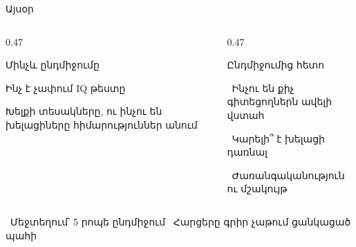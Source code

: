 \begin{frame}{Այսօր}
  \begin{columns}[T]
    \begin{column}{0.47\textwidth}
      \begin{card}[colback=peach!40!cream]
        {\blackfont Մինչև ընդմիջումը}\par\medskip
        \par\smallskip
        Ինչ է չափում IQ թեստը\par\medskip
        \par\smallskip
        Խելքի տեսակները, ու ինչու են խելացիները հիմարություններ անում
      \end{card}
    \end{column}
    \begin{column}{0.47\textwidth}
      \begin{card}[colback=lavender!45!cream]
        {\blackfont Ընդմիջումից հետո}\par\medskip
        \ Ինչու են քիչ գիտեցողներն ավելի վստահ\par\smallskip
        \ Կարելի՞ է խելացի դառնալ\par\smallskip
        \ Ժառանգականություն ու մշակույթ
      \end{card}
    \end{column}
  \end{columns}
  \vspace{3mm}
  \centering
  {\small {}\ Մեջտեղում՝ 5 րոպե ընդմիջում \qquad {}\ Հարցերը գրիր չաթում ցանկացած պահի}
\end{frame}
